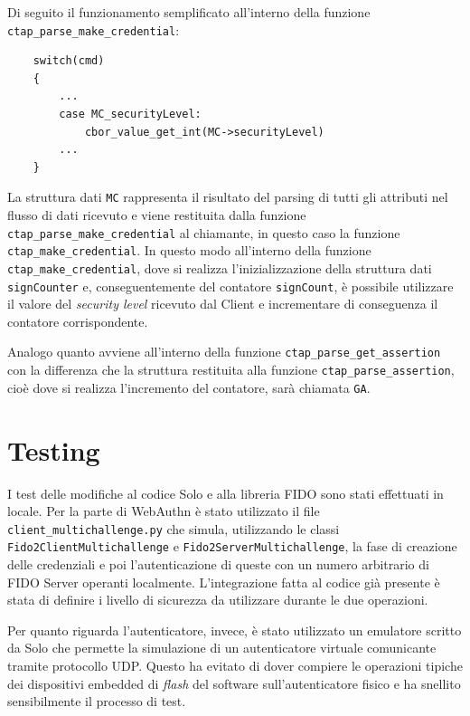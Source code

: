 Di seguito il funzionamento semplificato all'interno della funzione \verb*|ctap_parse_make_credential|:
\begin{verbatim}
    switch(cmd)
    {
        ...
        case MC_securityLevel:
            cbor_value_get_int(MC->securityLevel)
        ...
    }
\end{verbatim}
La struttura dati \verb*|MC| rappresenta il risultato del parsing di tutti gli attributi nel flusso di dati ricevuto e viene restituita dalla funzione \verb*|ctap_parse_make_credential| al chiamante, in questo caso la funzione \verb*|ctap_make_credential|. In questo modo all'interno della funzione \verb*|ctap_make_credential|, dove si realizza l'inizializzazione della struttura dati \verb*|signCounter| e, conseguentemente del contatore \verb*|signCount|, è possibile utilizzare il valore del \emph{security level} ricevuto dal Client e incrementare di conseguenza il contatore corrispondente.

Analogo quanto avviene all'interno della funzione \verb*|ctap_parse_get_assertion| con la differenza che la struttura restituita alla funzione \verb*|ctap_parse_assertion|, cioè dove si realizza l'incremento del contatore, sarà chiamata \verb*|GA|.


\section{Testing}
\label{testing}

I test delle modifiche al codice Solo e alla libreria FIDO sono stati effettuati in locale. Per la parte di WebAuthn è stato utilizzato il file \verb*|client_multichallenge.py| che simula, utilizzando le classi \verb*|Fido2ClientMultichallenge| e \verb*|Fido2ServerMultichallenge|, la fase di creazione delle credenziali e poi l'autenticazione di queste con un numero arbitrario di FIDO Server operanti localmente. 
L'integrazione fatta al codice già presente è stata di definire i livello di sicurezza da utilizzare durante le due operazioni. 

Per quanto riguarda l'autenticatore, invece, è stato utilizzato un emulatore scritto da Solo che permette la simulazione di un autenticatore virtuale comunicante tramite protocollo UDP. Questo ha evitato di dover compiere le operazioni tipiche dei dispositivi embedded di \emph{flash} del software sull'autenticatore fisico e ha snellito sensibilmente il processo di test. 


